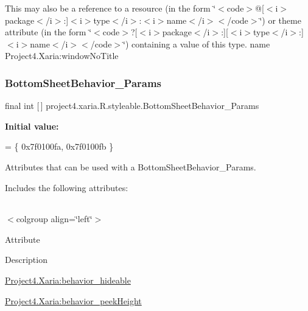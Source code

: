 This may also be a reference to a resource (in the form \char`\"{}$<$code$>$@\mbox{[}$<$i$>$package$<$/i$>$\+:\mbox{]}$<$i$>$type$<$/i$>$\+:$<$i$>$name$<$/i$>$$<$/code$>$\char`\"{}) or theme attribute (in the form \char`\"{}$<$code$>$?\mbox{[}$<$i$>$package$<$/i$>$\+:\mbox{]}\mbox{[}$<$i$>$type$<$/i$>$\+:\mbox{]}$<$i$>$name$<$/i$>$$<$/code$>$\char`\"{}) containing a value of this type.  name Project4.\+Xaria\+:window\+No\+Title \mbox{\label{classproject4_1_1xaria_1_1R_1_1styleable_ad80ceca30648e8c60ba2898c9560a573}} 
\subsubsection{\texorpdfstring{Bottom\+Sheet\+Behavior\+\_\+\+Params}{BottomSheetBehavior\_Params}}
{\footnotesize\ttfamily final int \mbox{[}$\,$\mbox{]} project4.\+xaria.\+R.\+styleable.\+Bottom\+Sheet\+Behavior\+\_\+\+Params\hspace{0.3cm}{\ttfamily [static]}}

{\bfseries Initial value\+:}
\begin{DoxyCode}
= \{
            0x7f0100fa, 0x7f0100fb
        \}
\end{DoxyCode}
Attributes that can be used with a Bottom\+Sheet\+Behavior\+\_\+\+Params. 

Includes the following attributes\+:

\tabulinesep=1mm
\begin{longtabu} spread 0pt [c]{*{0}{|X[-1]}|}
\hline
\end{longtabu}
$<$colgroup align=\char`\"{}left\char`\"{}$>$ 

Attribute

Description 

{\ttfamily \hyperlink{classproject4_1_1xaria_1_1R_1_1styleable_a231009c3ef6da1d5c6c2953970a8d053}{Project4.\+Xaria\+:behavior\+\_\+hideable}}

{\ttfamily \hyperlink{classproject4_1_1xaria_1_1R_1_1styleable_a8e3e2f702f3e393d6ad11344e517a348}{Project4.\+Xaria\+:behavior\+\_\+peek\+Height}}

